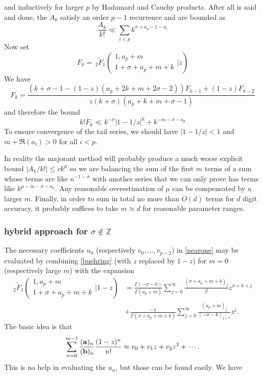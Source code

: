 \documentclass[10pt]{article}
\numberwithin{equation}{section}
\begin{document}
and inductively for larger $p$ by Hadamard and Cauchy products. After all is said and done, the $A_k$ satisfy an order $p-1$ recurrence and are bounded as
\begin{equation}
\frac{A_k}{k!} \ll \sum_{i<p}k^{\sigma+a_p-1-a_i}
\end{equation}
Now set
\begin{equation*}
F_k = \, _2\tilde{F}_1\left( \begin{array}{c} 1,a_p+m \\ 1+\sigma+a_p+m+k \end{array} \Big| z\right)
\end{equation*}
We have
\begin{equation*}
F_k=\frac{\left(k+\sigma -1 - (1-z) \left(a_p+2 k+m+2 \sigma
   -2\right)\right) F_{k-1} +(1-z) F_{k-2}}{z (k+\sigma )
   \left(a_p+k+m+\sigma -1\right)}
\end{equation*}
and therefore the bound
\begin{equation*}
k!F_k \ll k^{-\sigma} \left|1-1/z\right|^k + k^{-m-\sigma-a_p}
\end{equation*}
To ensure convergence of the tail series, we should have
$|1-1/z|<1$ and $m+\Re(a_i)>0$ for all $i<p$.

In reality the majorant method will probably produce a much worse explicit bound $|A_k/k!| \le c k^{\mu}$ so we are balancing the sum of the first $m$ terms of a sum whose terms are like $n^{-1-\sigma}$ with another series that we can only prove has terms like $k^{\mu-m-\sigma-a_p}$. Any reasonable overestimation of $\mu$ can be compensated by a larger $m$. Finally, in order to sum in total no more than $O(d)$ terms for $d$ digit accuracy, it probably suffices to take $m \approx d$ for reasonable parameter ranges.

\subsubsection{hybrid approach for $\sigma \not \in \mathbb{Z}$}
The necessary coefficients $u_0$ (respectively $v_0,\dots,v_{p-2}$) in \eqref{nearone} may be evaluated by combining \eqref{buehring} (with $z$ replaced by $1-z$) for $m=0$ (respectively large $m$) with the expansion
\begin{equation}
\label{2f1nearone}
\begin{aligned}
{}_2\tilde{F}_1\left(\begin{array}{c} 1,a_p+m \\ 1+\sigma+a_p+m+k \end{array} \Big| 1-z\right) &= \frac{\Gamma (-\sigma-k)}{\Gamma (a_p+m)} \sum_{j=0}^{\infty} \frac{(\sigma+a_p+m+k)_j}{j!}z^{\sigma+k+j}\\
&+\frac{-1}{\Gamma
   \left(\sigma+a_p+m+k\right)} \sum_{j=0}^{\infty} \frac{(a_p+m)_j}{(-\sigma-k)_{j+1}} z^j\text{.}
\end{aligned}
\end{equation}
The basic idea is that
\begin{equation}
\label{viapprox}
\sum_{n=0}^{m-1} \frac{(\bold a)_n}{(\bold b)_n}\frac{(1-z)^n}{n!} \approx v_0 + v_1 z + v_2 z^2 + \cdots\text{.}
\end{equation}
This is no help in evaluating the $u_n$, but those can be found easily. We have
\end{document}

